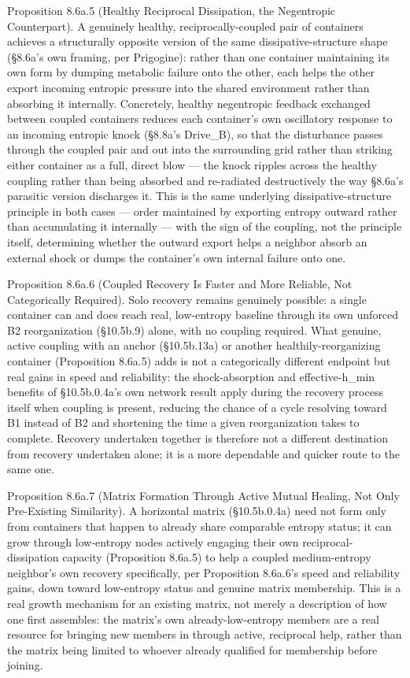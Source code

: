 \documentclass[
]{article}
\begin{document}
Proposition 8.6a.5 (Healthy Reciprocal Dissipation, the Negentropic
Counterpart). A genuinely healthy, reciprocally-coupled pair of
containers achieves a structurally opposite version of the same
dissipative-structure shape (§8.6a's own framing, per Prigogine): rather
than one container maintaining its own form by dumping metabolic failure
onto the other, each helps the other export incoming entropic pressure
into the shared environment rather than absorbing it internally.
Concretely, healthy negentropic feedback exchanged between coupled
containers reduces each container's own oscillatory response to an
incoming entropic knock (§8.8a's Drive\_B), so that the disturbance
passes through the coupled pair and out into the surrounding grid rather
than striking either container as a full, direct blow --- the knock
ripples across the healthy coupling rather than being absorbed and
re-radiated destructively the way §8.6a's parasitic version discharges
it. This is the same underlying dissipative-structure principle in both
cases --- order maintained by exporting entropy outward rather than
accumulating it internally --- with the sign of the coupling, not the
principle itself, determining whether the outward export helps a
neighbor absorb an external shock or dumps the container's own internal
failure onto one.

Proposition 8.6a.6 (Coupled Recovery Is Faster and More Reliable, Not
Categorically Required). Solo recovery remains genuinely possible: a
single container can and does reach real, low-entropy baseline through
its own unforced B2 reorganization (§10.5b.9) alone, with no coupling
required. What genuine, active coupling with an anchor (§10.5b.13a) or
another healthily-reorganizing container (Proposition 8.6a.5) adds is
not a categorically different endpoint but real gains in speed and
reliability: the shock-absorption and effective-h\_min benefits of
§10.5b.0.4a's own network result apply during the recovery process
itself when coupling is present, reducing the chance of a cycle
resolving toward B1 instead of B2 and shortening the time a given
reorganization takes to complete. Recovery undertaken together is
therefore not a different destination from recovery undertaken alone; it
is a more dependable and quicker route to the same one.

Proposition 8.6a.7 (Matrix Formation Through Active Mutual Healing, Not
Only Pre-Existing Similarity). A horizontal matrix (§10.5b.0.4a) need
not form only from containers that happen to already share comparable
entropy status; it can grow through low-entropy nodes actively engaging
their own reciprocal-dissipation capacity (Proposition 8.6a.5) to help a
coupled medium-entropy neighbor's own recovery specifically, per
Proposition 8.6a.6's speed and reliability gains, down toward
low-entropy status and genuine matrix membership. This is a real growth
mechanism for an existing matrix, not merely a description of how one
first assembles: the matrix's own already-low-entropy members are a real
resource for bringing new members in through active, reciprocal help,
rather than the matrix being limited to whoever already qualified for
membership before joining.
\end{document}
